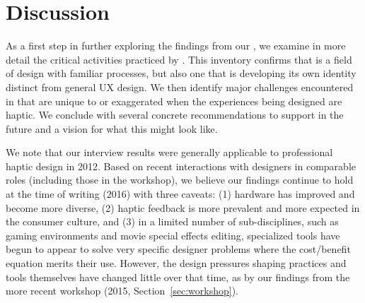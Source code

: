 



%
%
\section {Discussion}
\label{sec:discussion}
\noindent
%
As a first step in further exploring the findings from our , 
we examine in more detail the critical activities practiced by .
This inventory confirms that \haxd is a field of design with familiar processes, but also one that is developing its own identity distinct from general UX design.
We then identify major challenges encountered in \haxd that are unique to or exaggerated when the experiences being designed are haptic. %
We conclude with several concrete recommendations to support \haxd in the future and a vision for what this might look like.


We note that our interview results were generally applicable to professional haptic design in 2012.
Based on recent interactions with designers in comparable roles (including %
those in the workshop),  we believe our findings continue to hold at the time of writing (2016) with three caveats: (1) hardware has improved and become more diverse, (2) haptic feedback is more prevalent and more expected in the consumer culture, and (3) in a limited number of sub-disciplines, such as gaming environments and movie special effects editing, specialized tools have begun to appear to solve very specific designer problems where the cost/benefit equation merits their use. 
However, the design pressures shaping practices and tools themselves have changed little over that time, as  by our findings from the more recent workshop (2015, Section~\ref{sec:workshop}).


